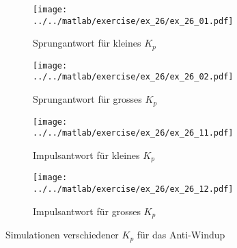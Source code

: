 \begin{figure}[h!]
	\centering
	\begin{subfigure}{0.45\textwidth}
		\texttt{[image: ../../matlab/exercise/ex\_26/ex\_26\_01.pdf]}
		\caption{Sprungantwort für kleines $K_p$}
		\label{fig:ex_26_01}
	\end{subfigure}
	\hfill{}
	\begin{subfigure}{0.45\textwidth}
		\texttt{[image: ../../matlab/exercise/ex\_26/ex\_26\_02.pdf]}
		\caption{Sprungantwort für grosses $K_p$}
	\end{subfigure}

	\begin{subfigure}{0.45\textwidth}
		\texttt{[image: ../../matlab/exercise/ex\_26/ex\_26\_11.pdf]}
		\caption{Impulsantwort für kleines $K_p$}
		\label{fig:ex_26_11}
	\end{subfigure}
	\hfill{}
	\begin{subfigure}{0.45\textwidth}
		\texttt{[image: ../../matlab/exercise/ex\_26/ex\_26\_12.pdf]}
		\caption{Impulsantwort für grosses $K_p$}
	\end{subfigure}

	\caption{Simulationen verschiedener $K_p$ für das Anti-Windup}

\end{figure}
